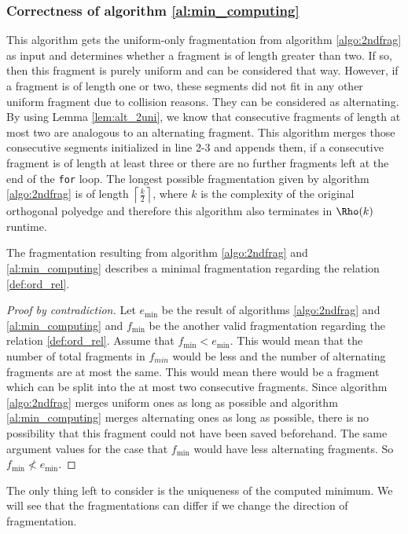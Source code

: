 \subsubsection{Correctness of algorithm \ref{al:min_computing}}
This algorithm gets the uniform-only fragmentation from algorithm \ref{algo:2ndfrag} as input and determines whether a fragment is of length greater than two. If so, then this fragment is purely uniform and can be considered that way. However, if a fragment is of length one or two, these segments did not fit in any other uniform fragment due to collision reasons. They can be considered as alternating. By using Lemma \ref{lem:alt_2uni}, we know that consecutive fragments of length at most two are analogous to an alternating fragment. This algorithm merges those consecutive segments initialized in line 2-3 and appends them, if a consecutive fragment is of length at least three or there are no further fragments left at the end of the \texttt{for} loop. The longest possible fragmentation given by algorithm \ref{algo:2ndfrag} is of length $\left\lceil\frac{k}{2}\right\rceil$, where $k$ is the complexity of the original orthogonal polyedge and therefore this algorithm also terminates in $\Rho(k)$ runtime.
\begin{theorem}
	The fragmentation resulting from algorithm \ref{algo:2ndfrag} and \ref{al:min_computing} describes a minimal fragmentation regarding the relation \ref{def:ord_rel}.\label{th:frag_min}
\end{theorem}
\begin{proof}[Proof by contradiction]
	Let $e_{\min}$ be the result of algorithms \ref{algo:2ndfrag} and \ref{al:min_computing} and $f_{\min}$ be the another valid fragmentation regarding the relation \ref{def:ord_rel}. Assume that $f_{\min} < e_{\min}$. This would mean that the number of total fragments in $f_{min}$ would be less and the number of alternating fragments are at most the same. This would mean there would be a fragment which can be split into the at most two consecutive fragments. Since algorithm \ref{algo:2ndfrag} merges uniform ones as long as possible and algorithm \ref{al:min_computing} merges alternating ones as long as possible, there is no possibility that this fragment could not have been saved beforehand. The same argument values for the case that $f_{\min}$ would have less alternating fragments. So $f_{\min} \nless e_{\min}$.
\end{proof}
The only thing left to consider is the uniqueness of the computed minimum. We will see that the fragmentations can differ if we change the direction of fragmentation.
